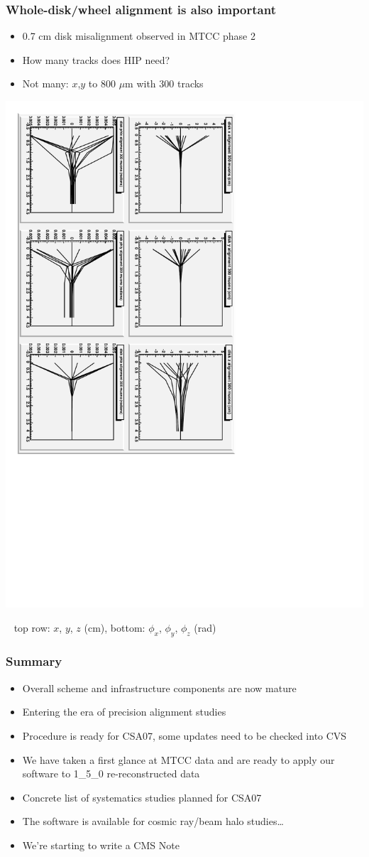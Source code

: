 \documentclass[compress]{beamer}
\begin{document}
\begin{frame}
\frametitle{Whole-disk/wheel alignment is also important}
\begin{itemize}
\item 0.7 cm disk misalignment observed in MTCC phase 2
\item How many tracks does HIP need?
\item Not many: $x$,$y$ to 800 $\mu$m with 300 tracks
\end{itemize}
\begin{center}
\includegraphics[height=0.7\linewidth, angle=90]{convergence_g300.pdf}
\end{center}
\mbox{ } \hfill \small top row: $x$, $y$, $z$ (cm), bottom: $\phi_x$, $\phi_y$, $\phi_z$ (rad)
\end{frame}

\begin{frame}
\frametitle{Summary}
\begin{itemize}\setlength{\itemsep}{0.25 cm}
\item Overall scheme and infrastructure components are now mature
\item Entering the era of precision alignment studies
\item Procedure is ready for CSA07, some updates need to be checked into CVS
\item We have taken a first glance at MTCC data and are ready to apply our software to 1\_5\_0 re-reconstructed data
\item Concrete list of systematics studies planned for CSA07
\item The software is available for cosmic ray/beam halo studies\ldots
\item We're starting to write a CMS Note
\end{itemize}
\label{numpages}
\end{frame}
\end{document}
